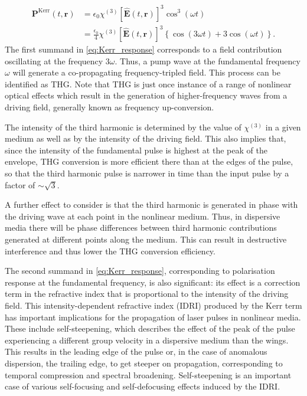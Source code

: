 \documentclass[a4paper]{jpconf}
\begin{document}
\begin{align}\label{eq:Kerr_response}
\nonumber  \mathbf{P}^\text{Kerr}(t,\mathbf{r}) &= \epsilon_0 \chi^{(3)} [\hat{\mathbf{E}}(t, \mathbf{r})]^3 \cos^3(\omega t) \\ &= \frac{\epsilon_0}{4}  \chi^{(3)} [\hat{\mathbf{E}}(t, \mathbf{r})]^3 \left\{ \cos (3\omega t) +  3 \cos(\omega t)\right\}.
\end{align}
The first summand in \eqref{eq:Kerr_response} corresponds to a field contribution oscillating at the frequency $3 \omega$. Thus, a pump wave at the fundamental frequency $\omega$ will generate a co-propagating frequency-tripled field. This process can be identified as THG. Note that THG is just once instance of a range of nonlinear optical effects which result in the generation of higher-frequency waves from a driving field, generally known as frequency up-conversion. \par 
The intensity of the third harmonic is determined by the value of $\chi^{(3)}$ in a given medium as well as by the intensity of the driving field. This also implies that, since the intensity of the fundamental pulse is highest at the peak of the envelope, THG conversion is more efficient there than at the edges of the pulse, so that the third harmonic pulse is narrower in time than the input pulse by a factor of $\sim\sqrt{3}$. \par 
 A further effect to consider is that the third harmonic is generated in phase with the driving wave at each point in the nonlinear medium. Thus, in dispersive media there will be phase differences between third harmonic contributions generated at different points along the medium. This can result in destructive interference and thus lower the THG conversion efficiency. \par 
The second summand in \eqref{eq:Kerr_response}, corresponding to polarisation response at the fundamental frequency, is also significant: its effect is a correction term in the refractive index that is proportional to the intensity of the driving field. This intensity-dependent refractive index (IDRI) produced by the Kerr term has important implications for the propagation of laser pulses in nonlinear media. These include self-steepening, which describes the effect of the peak of the pulse experiencing a different group velocity in a dispersive medium than the wings. This results in the leading edge of the pulse or, in the case of anomalous dispersion, the trailing edge, to get steeper on propagation, corresponding to temporal compression and spectral broadening. Self-steepening is an important case of various self-focusing and self-defocusing effects induced by the IDRI. \par 
\end{document}
